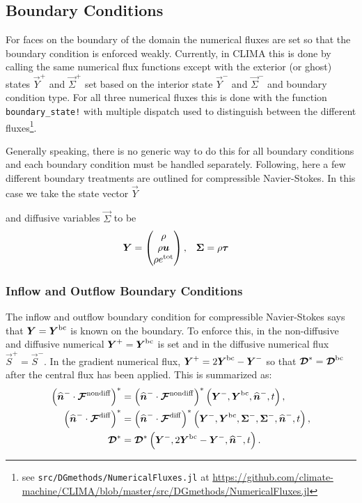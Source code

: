 \documentclass{report}
\begin{document}
{\subsection{Boundary Conditions}
For faces on the boundary of the domain the numerical fluxes are set so that the
boundary condition is enforced weakly. Currently, in CLIMA this is done by
calling the same numerical flux functions except with the exterior (or ghost)
states $\vec{Y}^{+}$ and $\vec{\Sigma}^{+}$ set based on the interior state
$\vec{Y}^{-}$ and $\vec{\Sigma}^{-}$ and boundary condition type. For all three
numerical fluxes this is done with the function \texttt{boundary\_state!} with
multiple dispatch used to distinguish between the different fluxes\footnote{see
\texttt{src/DGmethods/NumericalFluxes.jl} at
\url{https://github.com/climate-machine/CLIMA/blob/master/src/DGmethods/NumericalFluxes.jl}}.

Generally speaking, there is no generic way to do this for all boundary
conditions and each boundary condition must be handled separately. Following,
\citet{bassi:1997nse} here a few different boundary treatments are outlined for
compressible Navier-Stokes. In this case we take the state vector $\vec{Y}$} and
diffusive variables $\vec{\Sigma}$ to be
\begin{align}
  \vec{Y} &=
  \begin{pmatrix}
    \rho\\
    \rho\vec{u}\\
    \rho e^{\rm tot}
  \end{pmatrix},
  &
  \vec{\Sigma} &= \rho \vec{\tau}
\end{align}

\subsubsection{Inflow and Outflow Boundary Conditions}
The inflow and outflow boundary condition for compressible Navier-Stokes says
that $\vec{Y} = \vec{Y}^{\rm bc}$ is known on the boundary. To enforce this, in the
non-diffusive and diffusive numerical $\vec{Y}^{+} = \vec{Y}^{\rm bc}$ is set and in
the diffusive numerical flux $\vec{S}^{+} = \vec{S}^{-}$. In the gradient
numerical flux, $\vec{Y}^{+} = 2\vec{Y}^{\rm bc} - \vec{Y}^{-}$ so that
$\diffusive^{*} = \diffusive^{\rm bc}$ after the central flux has been applied.
This is summarized as:
\begin{align}
  {\left( \nhat^{-} \cdot \Fnondiff\right)}^{*} &=
  {\left( \nhat^{-} \cdot \Fnondiff\right)}^{*}
  \left(\vec{Y}^{-}, \vec{Y}^{\rm bc}, \nhat^{-}, t\right),\\
  {\left( \nhat^{-} \cdot \Fdiff\right)}^{*} &=
  {\left( \nhat^{-} \cdot \Fdiff\right)}^{*}
  \left(\vec{Y}^{-}, \vec{Y}^{\rm bc}, \vec{\Sigma}^{-}, \vec{\Sigma}^{-},
  \nhat^{-}, t\right),\\
  \diffusive^{*} &=
  \diffusive^{*}
  \left(\vec{Y}^{-}, 2\vec{Y}^{\rm bc}-\vec{Y}^{-}, \nhat^{-}, t\right).
\end{align}
\end{document}

